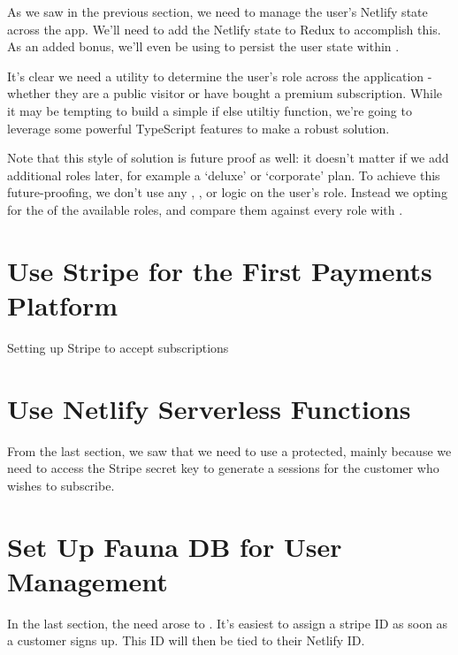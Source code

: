 \documentclass[paper=6in:9in,pagesize=pdftex,headinclude=on,footinclude=on,12pt,twoside]{scrbook}
\begin{document}
As we saw in the previous section, we need to manage the user's Netlify state across the app. We'll need to add the Netlify state to Redux to accomplish this. As an added bonus, we'll even be using  to persist the user state within .


It's clear we need a utility to determine the user's role across the application - whether they are a public visitor or have bought a premium subscription. While it may be tempting to build a simple if else utiltiy function, we're going to leverage some powerful TypeScript features to make a robust solution.

Note that this style of solution is future proof as well: it doesn't matter if we add additional roles later, for example a `deluxe' or `corporate' plan. To achieve this future-proofing, we don't use any , , or  logic on the user's role. Instead we opting for the  of the available roles, and compare them against every role with .

\section{Use Stripe for the First Payments Platform}
\begin{arrows}
\item Setting up Stripe to accept subscriptions
\end{arrows}

\section{Use Netlify Serverless Functions}

From the last section, we saw that we need to use a protected, mainly because we need to access the Stripe secret key to generate a sessions for the customer who wishes to subscribe.

\section{Set Up Fauna DB for User Management}

In the last section, the need arose to . It's easiest to assign a stripe ID as soon as a customer signs up. This ID will then be tied to their Netlify ID.
\end{document}
